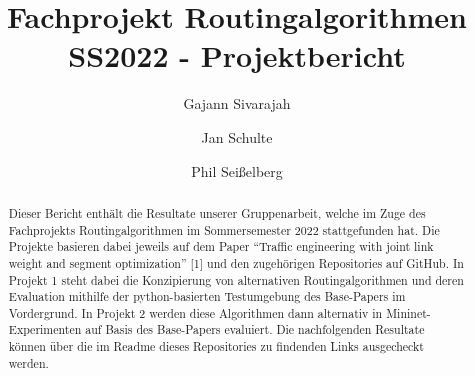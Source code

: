 \documentclass[sigconf,noacm,review]{acmart}
\begin{document}
\title{Fachprojekt Routingalgorithmen SS2022 - Projektbericht}


\author{Gajann Sivarajah}
\author{Jan Schulte}
\author{Phil Seißelberg}


\begin{abstract}
  Dieser Bericht enthält die Resultate unserer Gruppenarbeit, welche im Zuge des 
  Fachprojekts Routingalgorithmen im Sommersemester 2022 stattgefunden hat. 
  Die Projekte basieren dabei jeweils auf dem Paper ``Traffic engineering with joint link
  weight and segment optimization'' [1] und den zugehörigen Repositories auf GitHub.
  In Projekt 1 steht dabei die Konzipierung von alternativen Routingalgorithmen und deren Evaluation mithilfe der python-basierten Testumgebung des Base-Papers im Vordergrund.
  In Projekt 2 werden diese Algorithmen dann alternativ in Mininet-Experimenten auf Basis des Base-Papers evaluiert. Die nachfolgenden Resultate können über die im Readme dieses Repositories zu findenden Links
  ausgecheckt werden. 
  \end{abstract}

\maketitle
\end{document}

